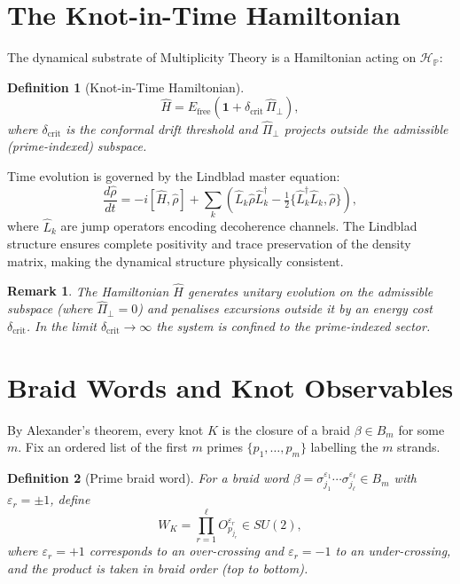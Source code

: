 \documentclass[11pt]{article}
\newtheorem{definition}{Definition}[section]
\newtheorem{remark}{Remark}[section]
\newcommand{\PP}{\mathbb{P}}
\begin{document}
\section{The Knot-in-Time Hamiltonian}

The dynamical substrate of Multiplicity Theory is a Hamiltonian acting on $\mathcal{H}_\PP$:

\begin{definition}[Knot-in-Time Hamiltonian]
\[
\hat{H} = E_{\text{free}}\!\left(\mathbf{1} + \delta_{\text{crit}}\,\hat{\Pi}_\perp\right),
\]
where $\delta_{\text{crit}}$ is the conformal drift threshold and $\hat{\Pi}_\perp$ projects outside the admissible (prime-indexed) subspace.
\end{definition}

Time evolution is governed by the Lindblad master equation:
\[
\frac{d\hat{\rho}}{dt}
= -i[\hat{H},\hat{\rho}]
+ \sum_k\!\left(\hat{L}_k\hat{\rho}\hat{L}_k^\dagger
- \tfrac12\{\hat{L}_k^\dagger\hat{L}_k,\hat{\rho}\}\right),
\]
where $\hat{L}_k$ are jump operators encoding decoherence channels. The Lindblad structure ensures complete positivity and trace preservation of the density matrix, making the dynamical structure physically consistent.

\begin{remark}
The Hamiltonian $\hat{H}$ generates unitary evolution on the admissible subspace (where $\hat{\Pi}_\perp=0$) and penalises excursions outside it by an energy cost $\delta_{\text{crit}}$. In the limit $\delta_{\text{crit}}\to\infty$ the system is confined to the prime-indexed sector.
\end{remark}

\section{Braid Words and Knot Observables}

By Alexander's theorem, every knot $K$ is the closure of a braid $\beta\in B_m$ for some $m$. Fix an ordered list of the first $m$ primes $\{p_1,\dots,p_m\}$ labelling the $m$ strands.

\begin{definition}[Prime braid word]
For a braid word $\beta=\sigma_{j_1}^{\varepsilon_1}\cdots\sigma_{j_\ell}^{\varepsilon_\ell}\in B_m$ with $\varepsilon_r=\pm1$, define
\[
W_K = \prod_{r=1}^\ell O_{p_{j_r}}^{\varepsilon_r}\in SU(2),
\]
where $\varepsilon_r=+1$ corresponds to an over-crossing and $\varepsilon_r=-1$ to an under-crossing, and the product is taken in braid order (top to bottom).
\end{definition}
\end{document}
